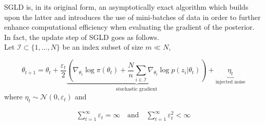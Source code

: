 \documentclass[11pt,a4paper]{report}\usepackage[]{graphicx}\usepackage[]{color}
\begin{document}
SGLD is, in its original form, an asymptotically exact algorithm which builds upon the latter and introduces the use of mini-batches of data in order to further enhance computational efficiency when evaluating the gradient of the posterior.
In fact, the update step of SGLD goes as follows.\\
Let $\mathcal I\subset \{1,...,N\}$ be an index subset of size $m\ll N$,

\begin{equation}
\label{eq:SGLD}
\theta_{t+1}=\theta_t+\frac{\varepsilon_t}{2}\underbrace{\left(\nabla_{\theta_t} \log\pi(\theta_t)+\frac{N}{n}
\sum_{i\in\mathcal I}\nabla_{\theta_t}\log p(z_i|\theta_t)\right)}_{\text{stochastic gradient}}+\underbrace{\eta_t}_{\text{injected noise}}
\end{equation}
where $\eta_t\sim\mathcal N(0,\varepsilon_t)$ and

\begin{align}
\label{eq:SGLD_cond}
\sum_{t=1}^\infty \varepsilon_t=\infty \quad\text{and}\quad \sum_{t=1}^\infty \varepsilon_t^2<\infty
\end{align}
\end{document}
